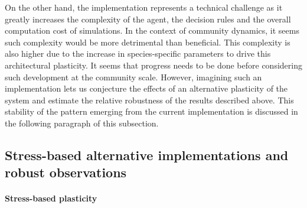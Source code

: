 On the other hand, the implementation represents a technical challenge as it greatly increases the complexity of the agent, the decision rules and the overall computation cost of simulations. In the context of community dynamics, it seems such complexity would be more detrimental than beneficial. This complexity is also higher due to the increase in species-specific parameters to drive this architectural plasticity. It seems that progress needs to be done before considering such development at the community scale. However, imagining such an implementation lets us conjecture the effects of an alternative plasticity of the system and estimate the relative robustness of the results described above. This stability of the pattern emerging from the current implementation is discussed in the following paragraph of this subsection.




%
%
%
%
%
%
%
%
%


\subsection{Stress-based alternative implementations and robust observations}\label{subsection:alternative}

\paragraph{Stress-based plasticity}

